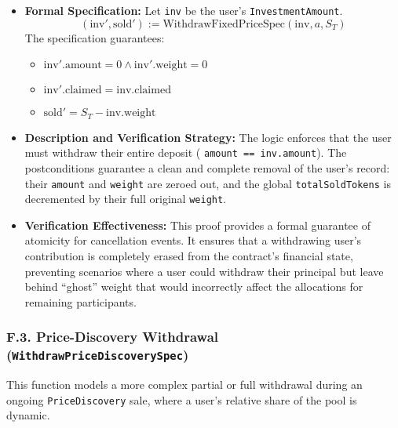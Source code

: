 \documentclass[
  english,
  onecolumn]{article}
\providecommand{\tightlist}{%
  \setlength{\itemsep}{0pt}\setlength{\parskip}{0pt}}
\begin{document}
\begin{itemize}
\tightlist
\item
  \textbf{Formal Specification:} Let \texttt{inv} be the user's
  \texttt{InvestmentAmount}. \[
  (\text{inv}', \text{sold}') := \text{WithdrawFixedPriceSpec}(\text{inv}, a, S_T)
  \] The specification guarantees:

  \begin{itemize}
  \tightlist
  \item
    \(\text{inv}'.\text{amount} = 0 \land \text{inv}'.\text{weight} = 0\)
  \item
    \(\text{inv}'.\text{claimed} = \text{inv}.\text{claimed}\)
  \item
    \(\text{sold}' = S_T - \text{inv}.\text{weight}\)
  \end{itemize}
\item
  \textbf{Description and Verification Strategy:} The logic enforces
  that the user must withdraw their entire deposit (
  \texttt{amount\ ==\ inv.amount}). The postconditions guarantee a clean
  and complete removal of the user's record: their \texttt{amount} and
  \texttt{weight} are zeroed out, and the global
  \texttt{totalSoldTokens} is decremented by their full original
  \texttt{weight}.
\item
  \textbf{Verification Effectiveness:} This proof provides a formal
  guarantee of atomicity for cancellation events. It ensures that a
  withdrawing user's contribution is completely erased from the
  contract's financial state, preventing scenarios where a user could
  withdraw their principal but leave behind ``ghost'' weight that would
  incorrectly affect the allocations for remaining participants.
\end{itemize}

\subsubsection{\texorpdfstring{F.3. Price-Discovery Withdrawal
(\texttt{WithdrawPriceDiscoverySpec})}{F.3. Price-Discovery Withdrawal (WithdrawPriceDiscoverySpec)}}\label{f.3.-price-discovery-withdrawal-withdrawpricediscoveryspec}

This function models a more complex partial or full withdrawal during an
ongoing \texttt{PriceDiscovery} sale, where a user's relative share of
the pool is dynamic.
\end{document}
